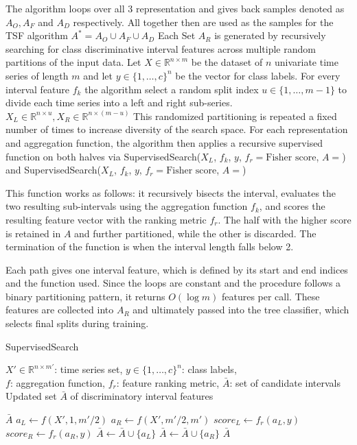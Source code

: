The algorithm loops over all 3 representation and gives back samples denoted as 
$A_O, A_F$ and $A_D$ respectively.
All together then are used as the samples for the TSF algorithm $A^* = A_O \cup A_F \cup A_D$ %
Each Set $A_R$ is generated by recursively searching for class discriminative 
interval features across multiple random partitions of the input data.
Let $X \in \mathbb{R}^{n \times m}$ be the dataset of $n$ univariate time series of length
$m$ and let $y\in \{1, \dots, c\}^n$ be the vector for class labels.
For every interval feature $f_k$ %
the algorithm select a random split index $u\in \{1,\dots, m-1 \}$ to divide each time series into a 
left and right sub-series. $X_L\in \mathbb{R}^{n \times u}, X_R \in \mathbb{R}^{n \times (m - u)}$
This randomized partitioning is repeated a fixed number of times to increase diversity of the search space. 
For each representation and aggregation function, the algorithm then applies a recursive supervised function on both halves via
SupervisedSearch($X_L$, $f_k$, $y$, $f_r= \text{Fisher score}$, $A={}$) and SupervisedSearch($X_L$, $f_k$, $y$, $f_r = \text{Fisher score}$, $A={}$)

This function works as follows: it recursively bisects the interval, evaluates the two resulting sub-intervals using the aggregation function $f_k$, 
and scores the resulting feature vector with the ranking metric $f_r$.
The half with the higher score is retained in $A$ and further partitioned, while the other is discarded.
The termination of the function is when the interval length falls below 2.

Each path gives one interval feature, which is defined by its start and end indices and the function used. 
Since the loops are constant and the procedure follows a binary partitioning pattern,
it returns $O(\log m)$ features per call. These features are collected into $A_R$ and ultimately passed into the 
tree classifier, which selects final splits during training.


\begin{algorithm}[H]
\caption{SupervisedSearch}
\begin{algorithmic}[1]
\Require $X' \in \mathbb{R}^{n \times m'}$: time series set, $y \in \{1,\dots,c\}^n$: class labels,\\
\hspace{1.6em} $f$: aggregation function, $f_r$: feature ranking metric, $\bar{A}$: set of candidate intervals
\Ensure Updated set $\bar{A}$ of discriminatory interval features

    \State \Return $\bar{A}$
\Else
    \State $a_L \gets f(X', 1, m'/2)$
    \State $a_R \gets f(X', m'/2, m')$
    \State $score_L \gets f_r(a_L, y)$
    \State $score_R \gets f_r(a_R, y)$
        \State $\bar{A} \gets \bar{A} \cup \{a_L\}$
        \State {}
    \Else
        \State $\bar{A} \gets \bar{A} \cup \{a_R\}$
        \State {}
    \EndIf
\EndIf
\State \Return $\bar{A}$
\end{algorithmic}
\end{algorithm}
